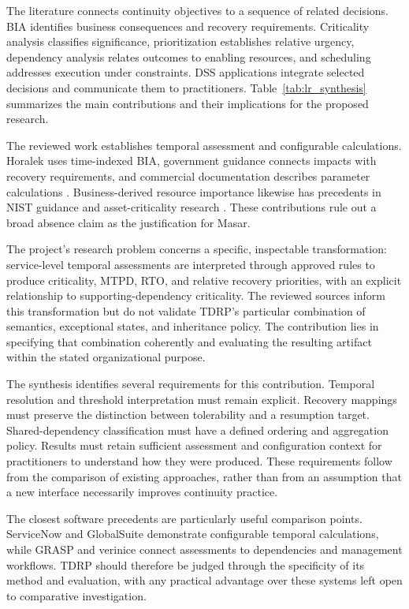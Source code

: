 The literature connects continuity objectives to a sequence of related decisions. BIA identifies business consequences and recovery requirements. Criticality analysis classifies significance, prioritization establishes relative urgency, dependency analysis relates outcomes to enabling resources, and scheduling addresses execution under constraints. DSS applications integrate selected decisions and communicate them to practitioners. Table~\ref{tab:lr_synthesis} summarizes the main contributions and their implications for the proposed research.



The reviewed work establishes temporal assessment and configurable calculations. Horalek uses time-indexed BIA, government guidance connects impacts with recovery requirements, and commercial documentation describes parameter calculations \cite{amm2023bia,dga2025guidelineen,globalsuite2025prebia,servicenow2025rto}. Business-derived resource importance likewise has precedents in NIST guidance and asset-criticality research \cite{nist2018criticality,quinn2025bia,assetcriticality2023}. These contributions rule out a broad absence claim as the justification for Masar.

The project's research problem concerns a specific, inspectable transformation: service-level temporal assessments are interpreted through approved rules to produce criticality, MTPD, RTO, and relative recovery priorities, with an explicit relationship to supporting-dependency criticality. The reviewed sources inform this transformation but do not validate TDRP's particular combination of semantics, exceptional states, and inheritance policy. The contribution lies in specifying that combination coherently and evaluating the resulting artifact within the stated organizational purpose.

The synthesis identifies several requirements for this contribution. Temporal resolution and threshold interpretation must remain explicit. Recovery mappings must preserve the distinction between tolerability and a resumption target. Shared-dependency classification must have a defined ordering and aggregation policy. Results must retain sufficient assessment and configuration context for practitioners to understand how they were produced. These requirements follow from the comparison of existing approaches, rather than from an assumption that a new interface necessarily improves continuity practice.

The closest software precedents are particularly useful comparison points. ServiceNow and GlobalSuite demonstrate configurable temporal calculations, while GRASP and verinice connect assessments to dependencies and management workflows. TDRP should therefore be judged through the specificity of its method and evaluation, with any practical advantage over these systems left open to comparative investigation.

